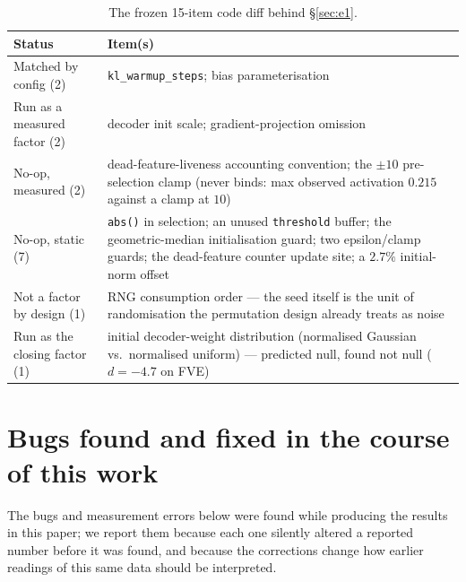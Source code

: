 \documentclass[11pt]{article}
\begin{document}
\begin{table}[h]
\centering
\caption{The frozen 15-item code diff behind \S\ref{sec:e1}.}
\label{tab:e1diff}
\begin{tabular}{lp{9cm}}
\toprule
Status & Item(s) \\
\midrule
Matched by config (2) & \texttt{kl\_warmup\_steps}; bias parameterisation \\
Run as a measured factor (2) & decoder init scale; gradient-projection omission \\
No-op, measured (2) & dead-feature-liveness accounting convention; the $\pm10$ pre-selection clamp (never binds: max observed activation $0.215$ against a clamp at $10$) \\
No-op, static (7) & \texttt{abs()} in selection; an unused \texttt{threshold} buffer; the geometric-median initialisation guard; two epsilon/clamp guards; the dead-feature counter update site; a $2.7\%$ initial-norm offset \\
Not a factor by design (1) & RNG consumption order --- the seed itself is the unit of randomisation the permutation design already treats as noise \\
Run as the closing factor (1) & initial decoder-weight distribution (normalised Gaussian vs.\ normalised uniform) --- predicted null, found not null ($d=-4.7$ on FVE) \\
\bottomrule
\end{tabular}
\end{table}

\section{Bugs found and fixed in the course of this work}
\label{app:bugs}

The bugs and measurement errors below were found while producing the
results in this paper; we report them because
each one silently altered a reported number before it was found, and because
the corrections change how earlier readings of this same data should be
interpreted.
\end{document}
